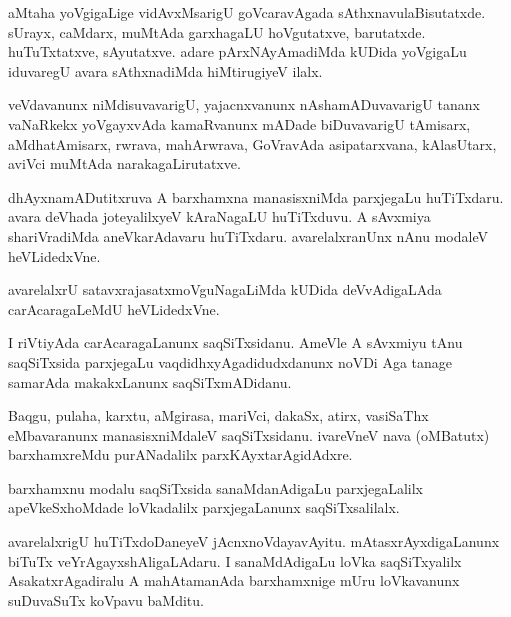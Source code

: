 \documentclass{article}
\begin{document}
\begin{mn}
aMtaha yoVgigaLige vidAvxMsarigU goVcaravAgada
sAthxnavulaBisutatxde. sUrayx, caMdarx, muMtAda garxhagaLU
hoVgutatxve, barutatxde. huTuTxtatxve, sAyutatxve. adare
pArxNAyAmadiMda kUDida yoVgigaLu iduvaregU avara sAthxnadiMda
hiMtirugiyeV ilalx.
\end{mn}

\begin{mn}
veVdavanunx niMdisuvavarigU, yajacnxvanunx nAshamADuvavarigU tananx
vaNaRkekx yoVgayxvAda kamaRvanunx mADade biDuvavarigU tAmisarx,
aMdhatAmisarx, rwrava, mahArwrava, GoVravAda asipatarxvana,
kAlasUtarx, aviVci muMtAda narakagaLirutatxve.
\end{mn}

\begin{mn}%
dhAyxnamADutitxruva A barxhamxna manasisxniMda parxjegaLu
huTiTxdaru. avara deVhada joteyalilxyeV kAraNagaLU huTiTxduvu. A
sAvxmiya shariVradiMda aneVkarAdavaru huTiTxdaru. avarelalxranUnx nAnu
modaleV heVLidedxVne.
\end{mn}

\begin{mn}
avarelalxrU satavxrajasatxmoVguNagaLiMda kUDida deVvAdigaLAda
carAcaragaLeMdU heVLidedxVne.
\end{mn}

\begin{mn}
I riVtiyAda carAcaragaLanunx saqSiTxsidanu. AmeVle A sAvxmiyu tAnu
saqSiTxsida parxjegaLu vaqdidhxyAgadidudxdanunx noVDi Aga tanage
samarAda makakxLanunx saqSiTxmADidanu.
\end{mn}

\begin{mn}%
Baqgu, pulaha, karxtu, aMgirasa, mariVci, dakaSx, atirx, vasiSaThx
eMbavaranunx manasisxniMdaleV saqSiTxsidanu. ivareVneV nava (oMBatutx)
barxhamxreMdu purANadalilx parxKAyxtarAgidAdxre.
\end{mn}

\begin{mn}
barxhamxnu modalu saqSiTxsida sanaMdanAdigaLu parxjegaLalilx
apeVkeSxhoMdade loVkadalilx parxjegaLanunx saqSiTxsalilalx.
\end{mn}

\begin{mn}
avarelalxrigU huTiTxdoDaneyeV jAcnxnoVdayavAyitu. mAtasxrAyxdigaLanunx
biTuTx veYrAgayxshAligaLAdaru. I sanaMdAdigaLu loVka saqSiTxyalilx
AsakatxrAgadiralu A mahAtamanAda barxhamxnige mUru loVkavanunx
suDuvaSuTx koVpavu baMditu.
\end{mn}
\end{document}
